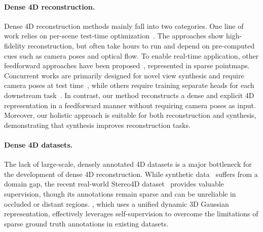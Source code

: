 \paragraph{Dense 4D reconstruction.}
Dense 4D reconstruction methods mainly fall into two categories.
One line of work relies on per-scene test-time optimization~\citep{Wang:2024:SM4,Wang:2024:TEE,Lei:2024:MOS,Liu:2025:MOD}. 
The approaches show high-fidelity reconstruction, but often take hours to run and depend on pre-computed cues such as camera poses and optical flow.
To enable real-time application, other feedforward approaches have been proposed~\citep{Han:2025:DDU,Sucar:2025:DPM,Liang:2025:ZSM,Feng:2025:ST4}, represented in sparse pointmaps.
Concurrent works are primarily designed for novel view synthesis and require camera poses at test time~\citep{lin2025movies,lin2025dgs,xu20254dgt}, while others require training separate heads for each downstream task~\citep{Badki:2025:L4P}.
In contrast, our method reconstructs a dense and explicit 4D representation in a feedforward manner without requiring camera poses as input.
Moreover, our holistic approach is suitable for both reconstruction and synthesis, demonstrating that synthesis improves reconstruction tasks. 

\paragraph{Dense 4D datasets.}
The lack of large-scale, densely annotated 4D datasets is a major bottleneck for the development of dense 4D reconstruction. 
While synthetic data~\citep{Zheng:2023:POA} suffers from a domain gap, the recent real-world Stereo4D dataset~\citep{Jin:2025:S4D} provides valuable supervision, though its annotations remain sparse and can be unreliable in occluded or distant regions.
\ourmethod{}, which uses a unified dynamic 3D Gaussian representation, effectively leverages self-supervision to overcome the limitations of sparse ground truth annotations in existing datasets.


